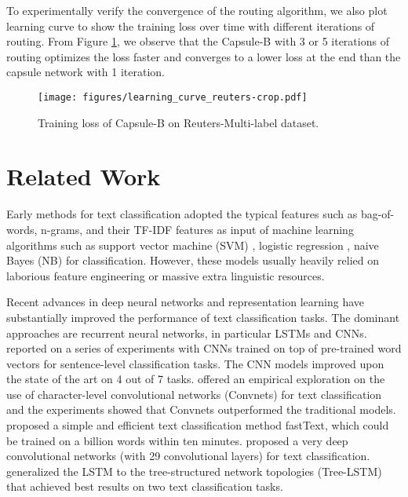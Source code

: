 \documentclass[11pt]{article}
\begin{document}
To experimentally verify the convergence of the routing algorithm, we also plot learning curve to show the training loss over time with different iterations of routing. From Figure \ref{fig:3}, we observe that the Capsule-B with 3 or 5 iterations of routing optimizes the loss faster and converges to a lower loss at the end than  the capsule network with 1 iteration. 

\begin{figure}[h!]
\centering
\texttt{[image: figures/learning\_curve\_reuters-crop.pdf]}
\caption{Training loss of Capsule-B on Reuters-Multi-label dataset.}
\label{fig:3}
\vspace{-0.5cm}
\end{figure}






















\section{Related Work} 
Early methods for text classification adopted the typical features such as bag-of-words, n-grams, and their TF-IDF features \cite{zhang2008tfidf} as input of  machine learning algorithms such as support vector machine (SVM) \cite{joachims1998text}, logistic regression \cite{genkin2007large}, naive Bayes (NB) \cite{mccallum1998comparison} for classification. However, these models usually heavily relied on laborious feature engineering or massive extra linguistic resources.


Recent advances in deep neural networks and representation learning have substantially improved the performance of text classification tasks. 
The dominant approaches are recurrent neural networks, in particular LSTMs and CNNs. 
\cite{kim2014convolutional} reported on a series of experiments with CNNs trained on top of pre-trained word vectors for sentence-level classification tasks. The CNN models improved upon the state of the art on 4 out of 7 tasks. 
\cite{zhang2015character} offered an empirical exploration on the use of character-level convolutional networks (Convnets) for text classification and  the experiments showed that Convnets outperformed the traditional models. 
\cite{joulin2016bag} proposed a simple and efficient text classification method fastText, which could be trained on a billion words within ten minutes. 
\cite{conneau2017very} proposed a very deep convolutional networks (with 29 convolutional layers) for text classification. 
\cite{tai2015improved} generalized the LSTM to the  tree-structured network topologies (Tree-LSTM) that achieved best results on two text classification tasks. 
\end{document}

